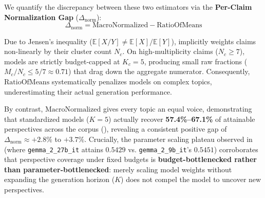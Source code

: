 \documentclass[11pt,a4paper]{article}
\begin{document}
We quantify the discrepancy between these two estimators via the \textbf{Per-Claim Normalization Gap} ($\Delta_{\text{norm}}$):
\begin{equation}
\label{eq:normalization_gap}
\Delta_{\text{norm}} = \text{MacroNormalized} - \text{RatioOfMeans}
\end{equation}

Due to Jensen's inequality ($\mathbb{E}[X/Y] \neq \mathbb{E}[X] / \mathbb{E}[Y]$),  implicitly weights claims non-linearly by their cluster count $N_c$. On high-multiplicity claims ($N_c \ge 7$), models are strictly budget-capped at $K_c = 5$, producing small raw fractions ($M_c / N_c \le 5/7 \approx 0.71$) that drag down the aggregate numerator. Consequently, $\text{RatioOfMeans}$ systematically penalizes models on complex topics, underestimating their actual generation performance. 

By contrast, $\text{MacroNormalized}$ gives every topic an equal voice, demonstrating that standardized models ($K=5$) actually recover \textbf{57.4\%--67.1\%} of attainable perspectives across the corpus (), revealing a consistent positive gap of $\Delta_{\text{norm}} \approx +2.8\%$ to $+3.7\%$. Crucially, the parameter scaling plateau observed in  (where \texttt{gemma\_2\_27b\_it} attains $0.5429$ vs. \texttt{gemma\_2\_9b\_it}'s $0.5451$) corroborates that perspective coverage under fixed budgets is \textbf{budget-bottlenecked rather than parameter-bottlenecked}: merely scaling model weights without expanding the generation horizon ($K$) does not compel the model to uncover new perspectives.
\end{document}
